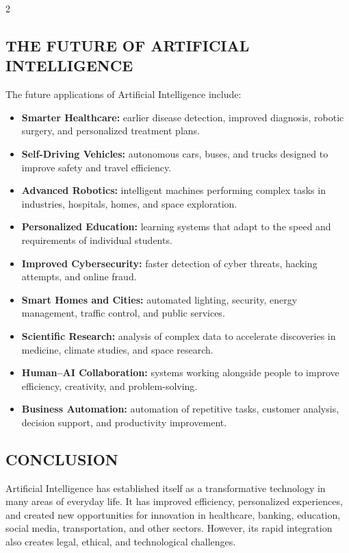 \begin{multicols}{2}
  \subsection*{\centering\uppercase{The Future of Artificial Intelligence}}
  The future applications of Artificial Intelligence include:

  \begin{itemize}\justifying
    \item \textbf{Smarter Healthcare:} earlier disease detection, improved diagnosis, robotic surgery, and personalized treatment plans.
    \item \textbf{Self-Driving Vehicles:} autonomous cars, buses, and trucks designed to improve safety and travel efficiency.
    \item \textbf{Advanced Robotics:} intelligent machines performing complex tasks in industries, hospitals, homes, and space exploration.
    \item \textbf{Personalized Education:} learning systems that adapt to the speed and requirements of individual students.
    \item \textbf{Improved Cybersecurity:} faster detection of cyber threats, hacking attempts, and online fraud.
    \item \textbf{Smart Homes and Cities:} automated lighting, security, energy management, traffic control, and public services.
    \item \textbf{Scientific Research:} analysis of complex data to accelerate discoveries in medicine, climate studies, and space research.
    \item \textbf{Human--AI Collaboration:} systems working alongside people to improve efficiency, creativity, and problem-solving.
    \item \textbf{Business Automation:} automation of repetitive tasks, customer analysis, decision support, and productivity improvement.
  \end{itemize}

  \subsection*{\centering\uppercase{Conclusion}}
  Artificial Intelligence has established itself as a transformative technology in many areas of everyday life. It has improved efficiency, personalized experiences, and created new opportunities for innovation in healthcare, banking, education, social media, transportation, and other sectors. However, its rapid integration also creates legal, ethical, and technological challenges.


\end{multicols}

